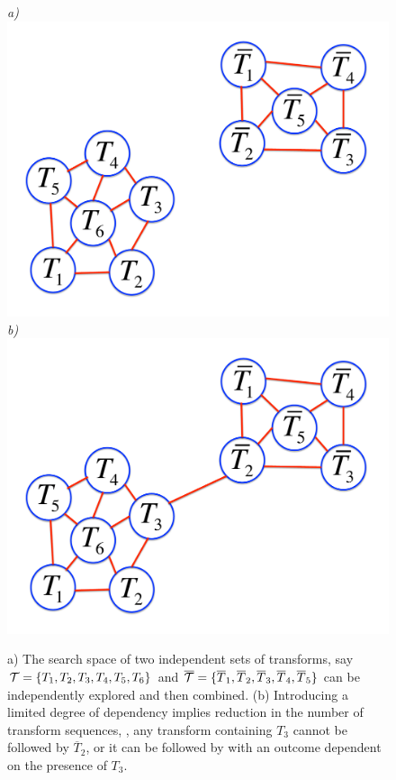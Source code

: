 \begin{figure}[!ht]
\centering
{\footnotesize\textit{a)}}\includegraphics[width=0.25\linewidth]{figs/clusters.pdf}
{\footnotesize\textit{b)}}\includegraphics[width=0.25\linewidth]{figs/clusters_depend.pdf}
\caption{a) The search space of two independent sets of transforms, say ${\cal T}=\{T_1,T_2,T_3,T_4,T_5,T_6\}$ and $\overline{\cal T}=\{\overline{T}_1,\overline{T}_2,\overline{T}_3,\overline{T}_4,\overline{T}_5\}$ can be independently explored and then combined. (b) Introducing a limited degree of dependency implies reduction in the number of transform sequences, \ie, any transform containing $T_3$ cannot be followed by $\overline{T}_2$, or it can be followed by with an outcome dependent on the presence of $T_3$.}
\label{fig:cluster_sets}
\end{figure}


